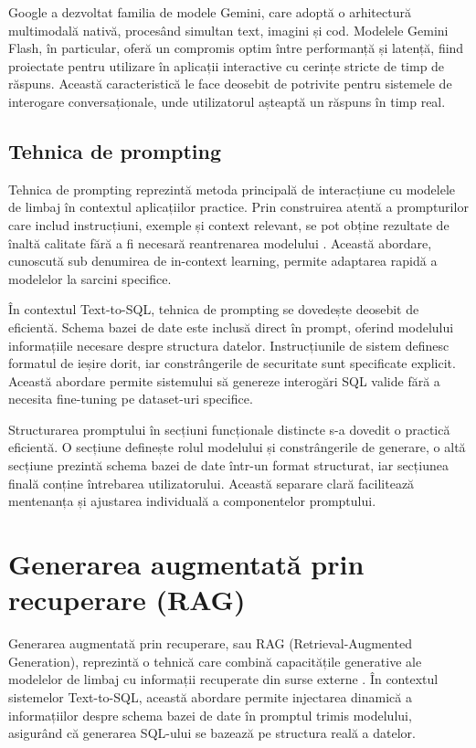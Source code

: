 \documentclass[12pt, a4paper]{report}
\begin{document}
Google a dezvoltat familia de modele Gemini, care adoptă o arhitectură multimodală nativă, procesând simultan text, imagini și cod. Modelele Gemini Flash, în particular, oferă un compromis optim între performanță și latență, fiind proiectate pentru utilizare în aplicații interactive cu cerințe stricte de timp de răspuns. Această caracteristică le face deosebit de potrivite pentru sistemele de interogare conversaționale, unde utilizatorul așteaptă un răspuns în timp real.

\subsection{Tehnica de prompting}

Tehnica de prompting reprezintă metoda principală de interacțiune cu modelele de limbaj în contextul aplicațiilor practice. Prin construirea atentă a prompturilor care includ instrucțiuni, exemple și context relevant, se pot obține rezultate de înaltă calitate fără a fi necesară reantrenarea modelului \cite{gpt3}. Această abordare, cunoscută sub denumirea de in-context learning, permite adaptarea rapidă a modelelor la sarcini specifice.

În contextul Text-to-SQL, tehnica de prompting se dovedește deosebit de eficientă. Schema bazei de date este inclusă direct în prompt, oferind modelului informațiile necesare despre structura datelor. Instrucțiunile de sistem definesc formatul de ieșire dorit, iar constrângerile de securitate sunt specificate explicit. Această abordare permite sistemului să genereze interogări SQL valide fără a necesita fine-tuning pe dataset-uri specifice.

Structurarea promptului în secțiuni funcționale distincte s-a dovedit o practică eficientă. O secțiune definește rolul modelului și constrângerile de generare, o altă secțiune prezintă schema bazei de date într-un format structurat, iar secțiunea finală conține întrebarea utilizatorului. Această separare clară facilitează mentenanța și ajustarea individuală a componentelor promptului.

\section{Generarea augmentată prin recuperare (RAG)}

Generarea augmentată prin recuperare, sau RAG (Retrieval-Augmented Generation), reprezintă o tehnică care combină capacitățile generative ale modelelor de limbaj cu informații recuperate din surse externe \cite{rag}. În contextul sistemelor Text-to-SQL, această abordare permite injectarea dinamică a informațiilor despre schema bazei de date în promptul trimis modelului, asigurând că generarea SQL-ului se bazează pe structura reală a datelor.
\end{document}
